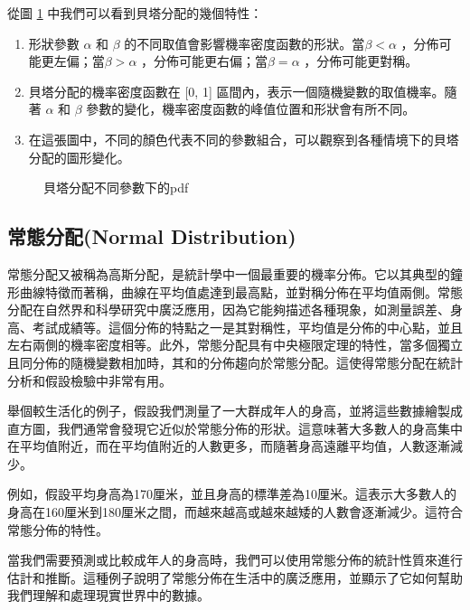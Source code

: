 \documentclass[12pt, a4paper]{article}
\begin{document}
從圖 \ref{fig:beta-distribution_a,b_pdf} 中我們可以看到貝塔分配的幾個特性：
\begin{enumerate}
\item 形狀參數 $\alpha$ 和 $\beta$ 的不同取值會影響機率密度函數的形狀。當$\beta <\alpha$ ，分佈可能更左偏；當$\beta >\alpha$ ，分佈可能更右偏；當$\beta =\alpha$ ，分佈可能更對稱。
\item 貝塔分配的機率密度函數在 [0, 1] 區間內，表示一個隨機變數的取值機率。隨著 $\alpha$ 和 $\beta$ 參數的變化，機率密度函數的峰值位置和形狀會有所不同。
\item 在這張圖中，不同的顏色代表不同的參數組合，可以觀察到各種情境下的貝塔分配的圖形變化。
\end{enumerate}
\begin{figure}[H]
    \caption{貝塔分配不同參數下的pdf}
    \label{fig:beta-distribution_a,b_pdf}
\end{figure}
\subsection{常態分配(Normal Distribution)}
常態分配又被稱為高斯分配，是統計學中一個最重要的機率分佈。它以其典型的鐘形曲線特徵而著稱，曲線在平均值處達到最高點，並對稱分佈在平均值兩側。常態分配在自然界和科學研究中廣泛應用，因為它能夠描述各種現象，如測量誤差、身高、考試成績等。這個分佈的特點之一是其對稱性，平均值是分佈的中心點，並且左右兩側的機率密度相等。此外，常態分配具有中央極限定理的特性，當多個獨立且同分佈的隨機變數相加時，其和的分佈趨向於常態分配。這使得常態分配在統計分析和假設檢驗中非常有用。

舉個較生活化的例子，假設我們測量了一大群成年人的身高，並將這些數據繪製成直方圖，我們通常會發現它近似於常態分佈的形狀。這意味著大多數人的身高集中在平均值附近，而在平均值附近的人數更多，而隨著身高遠離平均值，人數逐漸減少。

例如，假設平均身高為170厘米，並且身高的標準差為10厘米。這表示大多數人的身高在160厘米到180厘米之間，而越來越高或越來越矮的人數會逐漸減少。這符合常態分佈的特性。

當我們需要預測或比較成年人的身高時，我們可以使用常態分佈的統計性質來進行估計和推斷。這種例子說明了常態分佈在生活中的廣泛應用，並顯示了它如何幫助我們理解和處理現實世界中的數據。
\end{document}
